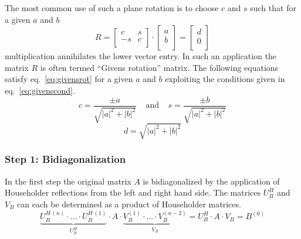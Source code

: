 The most common use of such a plane rotation is to choose $c$ and $s$
such that for a given $a$ and $b$
\begin{equation}
\label{eq:givensrot}
R =
\left[\begin{array}{rl}
c & s\\
-s & c\\
\end{array}\right]
\cdot
\begin{bmatrix}
a\\
b\\
\end{bmatrix}
=
\begin{bmatrix}
d\\
0\\
\end{bmatrix}
\end{equation}
multiplication annihilates the lower vector entry.  In such an
application the matrix $R$ is often termed ``Givens rotation'' matrix.
The following equations satisfy eq.~\eqref{eq:givensrot} for a given
$a$ and $b$ exploiting the conditions given in
eq.~\eqref{eq:givenscond}.
\begin{equation}
c = \dfrac{\pm a}{\sqrt{\left|a\right|^2 + \left|b\right|^2}}
\;\;\;\; \textrm{and} \;\;\;\;
s = \dfrac{\pm b}{\sqrt{\left|a\right|^2 + \left|b\right|^2}}
\end{equation}
\begin{equation}
d = \sqrt{\left|a\right|^2 + \left|b\right|^2}
\end{equation}

\subsubsection{Step 1: Bidiagonalization}

In the first step the original matrix $A$ is bidiagonalized by the
application of Householder reflections from the left and right hand
side.  The matrices $U_B^H$ and $V_B$ can each be determined as a
product of Householder matrices.
\begin{equation}
\underbrace{U_B^{H\,(n)}\cdot\ldots\cdot U_B^{H\,(1)}}_{U_B^H}\cdot A\cdot
\underbrace{V_B^{(1)}\cdot\ldots\cdot V_B^{(n-2)}}_{V_B}
= U_B^H\cdot A\cdot V_B = B^{(0)}
\end{equation}

